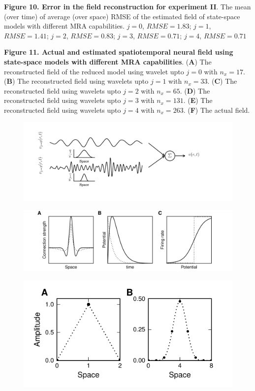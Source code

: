 \documentclass[review,authoryear,3p]{elsarticle}
\begin{document}
{\bf Figure 10. Error in the field reconstruction for experiment II}. The mean (over time) of average (over space) RMSE of the estimated field of state-space models with different MRA capabilities. $j=0$, $RMSE = 1.83$; $j=1$, $RMSE = 1.41$; $j=2$, $RMSE = 0.83$; $j=3$, $RMSE = 0.71$; $j=4$, $RMSE=0.71$ 

{\bf Figure 11. Actual and estimated spatiotemporal neural field using state-space models with different MRA capabilities}. (\textbf{A}) The reconstructed field of the reduced model using wavelet upto $j=0$ with $n_x=17$. (\textbf{B}) The reconstructed field using wavelets upto $j=1$ with $n_x=33$. (\textbf{C}) The reconstructed field  using wavelets upto $j=2$ with $n_x=65$. (\textbf{D}) The reconstructed field using wavelets upto $j=3$ with $n_x=131$. (\textbf{E}) The reconstructed field using wavelets upto $j=4$ with $n_x=263$. (\textbf{F}) The actual field. 
  \clearpage
   \newpage 
   \begin{figure}[t]
   		\includegraphics[scale=1]{Graph/fig1.pdf}
   	\caption{}
   	\label{fig:MultiLayerFieldModel}
   \end{figure}  
 \clearpage
  \newpage 
  \begin{figure}[!t]
  \centering
  \includegraphics[scale=1]{Graph/fig2.pdf}
  \caption{}
  \label{fig:Modelcomponents}
  \end{figure}
  \clearpage
  \newpage  
  \begin{figure}[!t]
  \centering
  \includegraphics{Graph/fig3.pdf}
  \caption{}
  \label{fig:Figure0}
  \end{figure} 
\end{document}
